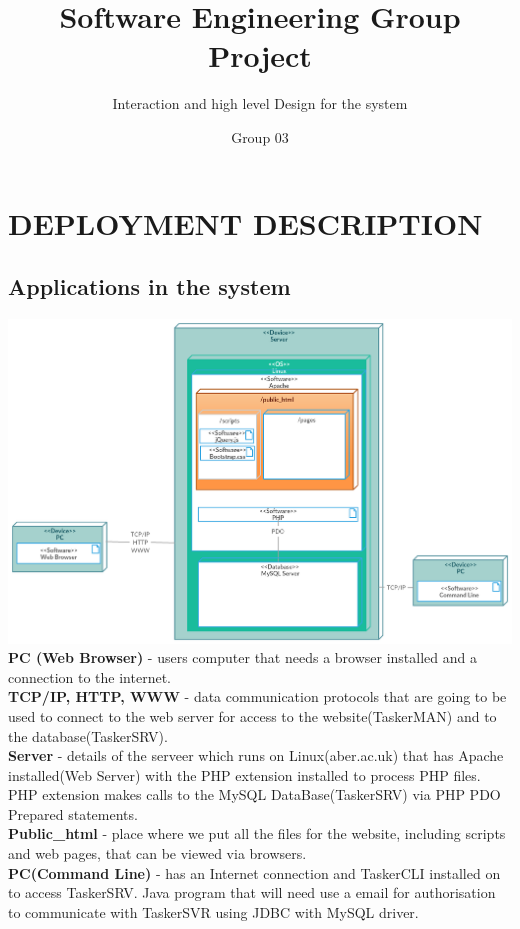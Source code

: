 \documentclass[10pt]{project}
\begin{document}
\title{Software Engineering Group Project}
\subtitle{Interaction and high level Design for the system}
\author{Group 03}     
\shorttitle{\LaTeX}
\maketitle
\tableofcontents
\newpage

\section{DEPLOYMENT DESCRIPTION}
\subsection{Applications in the system}
\includegraphics{apps} 
{\bf PC (Web Browser)} - users computer that needs a browser installed and a connection to the internet. \\
{\bf TCP/IP, HTTP, WWW} - data communication protocols that are going to be used to connect to the web server for access to the website(TaskerMAN) and to the database(TaskerSRV). \\
{\bf Server} - details of the serveer which runs on Linux(aber.ac.uk) that has Apache installed(Web Server) with the PHP extension installed to process PHP files. PHP extension makes calls to the MySQL DataBase(TaskerSRV) via PHP PDO Prepared statements. \\
{\bf Public\_html} - place where we put all the files for the website, including scripts and web pages, that can be viewed via browsers.\\
{\bf PC(Command Line)} - has an Internet connection and TaskerCLI installed on to access TaskerSRV. Java program that will need use a email for authorisation to communicate with TaskerSVR  using JDBC with MySQL driver.
\end{document}
